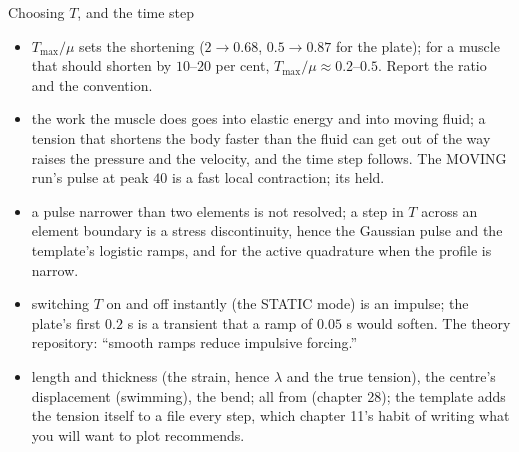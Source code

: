 \documentclass[aspectratio=169,11pt]{beamer}
\begin{document}
\begin{frame}{Choosing $T$, and the time step}
\label{fr:choose}
\footnotesize
\begin{itemize}
  \item {} $T_{\max}/\mu$ sets the shortening ($2 \to 0.68$, $0.5 \to 0.87$ for the plate); for a muscle that should shorten by $10$--$20$ per cent, $T_{\max}/\mu \approx 0.2$--$0.5$. Report the ratio and the convention.
  \item {} the work the muscle does goes into elastic energy and into moving fluid; a tension that shortens the body faster than the fluid can get out of the way raises the pressure and the velocity, and the time step follows. The MOVING run's pulse at peak $40$ is a fast local contraction; its  held.
  \item {} a pulse narrower than two elements is not resolved; a step in $T$ across an element boundary is a stress discontinuity, hence the Gaussian pulse and the template's logistic ramps, and  for the active quadrature when the profile is narrow.
  \item {} switching $T$ on and off instantly (the STATIC mode) is an impulse; the plate's first $0.2$ s is a transient that a ramp of $0.05$ s would soften. The theory repository: ``smooth ramps reduce impulsive forcing.''
  \item {} length and thickness (the strain, hence $\lambda$ and the true tension), the centre's displacement (swimming), the bend; all from  (chapter 28); the template adds the tension itself to a  file every step, which chapter 11's habit of writing what you will want to plot recommends.
\end{itemize}
\end{frame}
\end{document}
